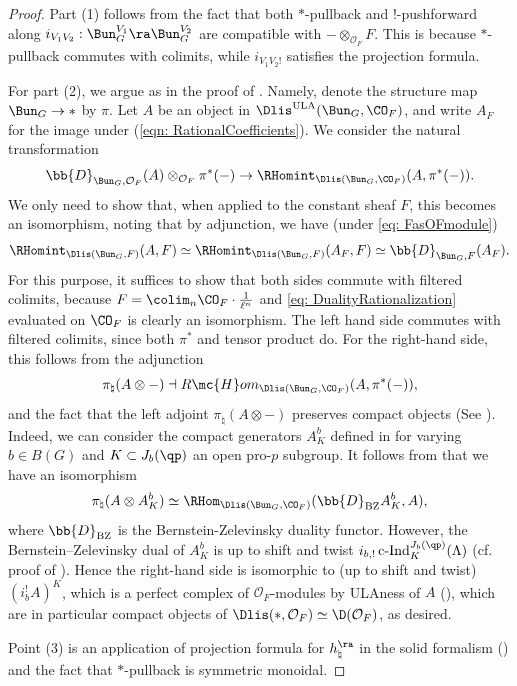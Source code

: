 \documentclass[letterpaper,11pt]{amsart}
\begin{document}
\begin{proof}
Part (1) follows from the fact that both $*$-pullback and $!$-pushforward along $i_{V_{1}V_{2}}: \Bun_{G}^{V_{1}} \ra \Bun_{G}^{V_{2}}$ are compatible with $- \otimes_{\mathcal{O}_{F}} F$. This is because $*$-pullback commutes with colimits, while $i_{V_{1}V_{2}!}$ satisfies the projection formula.

For part (2), we argue as in the proof of \cite[Proposition IV.2.19]{FSGeomLLC}. Namely, denote the structure map $\Bun_G\to \ast$ by $\pi$. Let $A$ be an object in $\Dlis^\mathrm{ULA}(\Bun_G, \CO_F)$, and write $A_{F}$ for the image under (\ref{eqn: RationalCoefficients}). We consider the natural transformation 
\begin{equation}\label{eq: DualityRationalization}
    \bb{D}_{\Bun_{G},\mathcal{O}_{F}}(A) \otimes_{\mathcal{O}_{F}} \pi^\ast(-)\to \RHomint_{\Dlis(\Bun_{G},\CO_F)}(A, \pi^\ast(-)).
\end{equation} 
We only need to show that, when applied to the constant sheaf $F$, this becomes an isomorphism, noting that by adjunction, we have (under \eqref{eq: FasOFmodule})
\[ \RHomint_{\Dlis(\Bun_{G},F)}(A, F)\simeq \RHomint_{\Dlis(\Bun_{G},F)}(A_F, F)\simeq \bb{D}_{\Bun_{G},F}(A_F).\]
For this purpose, it suffices to show that both sides commute with filtered colimits, because $F=\colim_n \CO_F\cdot \tfrac{1}{\ell^n}$ and \eqref{eq: DualityRationalization} evaluated on $\CO_F$ is clearly an isomorphism. The left hand side commutes with filtered colimits, since both $\pi^\ast$ and tensor product do. For the right-hand side, this follows from the adjunction
\[ \pi_\natural(A\otimes-) \dashv R\mc{H}om_{\Dlis(\Bun_{G},\CO_F)}(A, \pi^\ast(-)),\]
and the fact that the left adjoint $\pi_\natural(A\otimes-)$ preserves compact objects (See \cite[Lemma~IV.2.20]{FSGeomLLC}). Indeed, we can consider the compact generators $A_K^b$ defined in \cite[Proposition VII.7.4]{FSGeomLLC} for varying $b \in B(G)$ and $K\subset J_b(\qp)$ an open pro-$p$ subgroup. It follows from \cite[Proposition VII.7.6]{FSGeomLLC} that  we have an isomorphism 
\[ \pi_{\natural}(A \otimes A_K^b) \simeq \RHom_{\Dlis(\Bun_{G},\CO_F)}(\bb{D}_{\mathrm{BZ}}A_K^b, A), \]
where $\bb{D}_{\mathrm{BZ}}$ is the Bernstein-Zelevinsky duality functor. However, the Bernstein--Zelevinsky dual of $A_K^b$ is up to shift and twist $i_{b,!}\operatorname{c-Ind}_K^{J_b(\qp)}(\Lambda)$ (cf. proof of \cite[Proposition 7.6]{FSGeomLLC}). Hence the right-hand side is isomorphic to (up to shift and twist) $(i_b^!A)^K$, which is a perfect complex of $\mathcal{O}_{F}$-modules by ULAness of $A$ (\cite[Proposition VII.7.9]{FSGeomLLC}), which are in particular compact objects of $\Dlis(\ast,\mathcal{O}_{F}) \simeq \D(\mathcal{O}_{F})$, as desired.





Point (3) is an application of projection formula for $h^{\ra}_{\natural}$ in the solid formalism (\cite[Proposition VII.3.1 (i)]{FSGeomLLC}) and the fact that $*$-pullback is symmetric monoidal. 
\end{proof}
\end{document}
